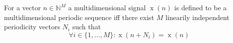 For a vector $n \in \mathbb{N}^M$ a multidimensional signal $\operatorname{x}(n)$ is defined to be a multidimensional periodic sequence iff there exist $M$ linearily independent periodicity vectors $N_i$ such that
$$\forall i \in \{1, \dots, M\} : \operatorname{x}(n + N_i) = \operatorname{x}(n)$$
